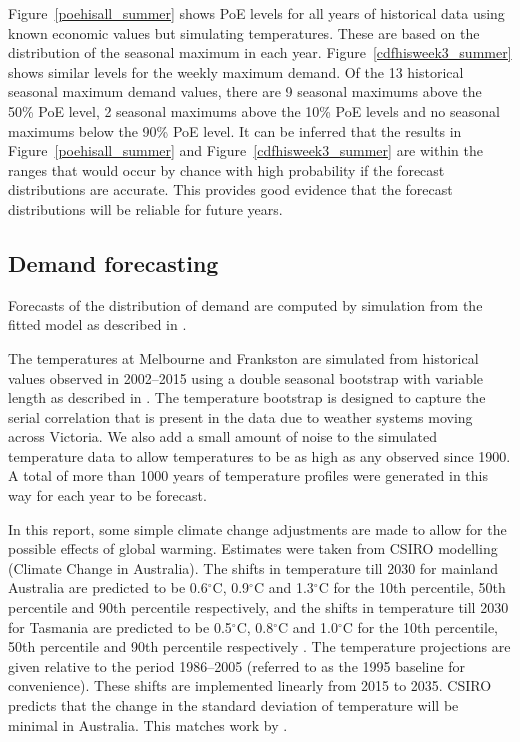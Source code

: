 \documentclass[11pt]{article}
\begin{document}


Figure~\ref{poehisall_summer} shows PoE levels for all years of historical data using known economic values but simulating temperatures. These are based on the distribution of the seasonal maximum in each year. Figure~\ref{cdfhisweek3_summer} shows similar levels for the weekly maximum demand. Of the 13 historical seasonal maximum demand values, there are 9 seasonal maximums above the 50\% PoE level, 2 seasonal maximums above the 10\% PoE levels and no seasonal maximums below the 90\% PoE level. It can be inferred that the results in Figure~\ref{poehisall_summer} and Figure~\ref{cdfhisweek3_summer} are within the ranges that would occur by chance with high probability if the forecast distributions are accurate. This provides good evidence that the forecast distributions will be reliable for future years.

%
%

\subsection{Demand forecasting}\label{sec:forecast}

Forecasts of the distribution of demand are computed by simulation from the fitted model as described in \citet{Tech15}.

The temperatures at Melbourne and Frankston are simulated from historical values observed in 2002--2015 using a double seasonal bootstrap with variable length as described in \citet{Tech15}. The temperature bootstrap is designed to capture the serial correlation that is present in the data due to weather systems moving across Victoria. We also add a small amount of noise to the simulated temperature data to allow temperatures to be as high as any observed since 1900. A total of more than 1000 years of temperature profiles were generated in this way for each year to be forecast.

In this report, some simple climate change adjustments are made to allow for the possible effects of global warming. Estimates were taken from CSIRO modelling (Climate Change in Australia). The shifts in temperature till 2030 for mainland Australia are predicted to be 0.6$^\circ$C, 0.9$^\circ$C and 1.3$^\circ$C for the 10th percentile, 50th percentile and 90th percentile respectively, and the shifts in temperature till 2030 for Tasmania are predicted to be 0.5$^\circ$C, 0.8$^\circ$C and 1.0$^\circ$C for the 10th percentile, 50th percentile and 90th percentile respectively \citep{CSIROTemp2015}. The temperature projections are given relative to the period 1986--2005 (referred to as the 1995 baseline for convenience). These shifts are implemented linearly from 2015 to 2035. CSIRO predicts that the change in the standard deviation of temperature will be minimal in Australia. This matches work by \citep{Raisanen02}.
\end{document}
